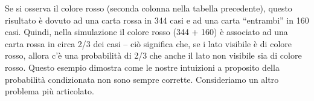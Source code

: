 \documentclass[
  11pt,
]{krantz}
\makeatletter
\newenvironment{Shaded}{\begin{snugshade}}{\end{snugshade}}
\newcommand{\AttributeTok}[1]{\textcolor[rgb]{0.61,0.61,0.61}{#1}}
\newcommand{\CommentTok}[1]{\textcolor[rgb]{0.37,0.37,0.37}{\textit{#1}}}
\newcommand{\ConstantTok}[1]{\textcolor[rgb]{0,0,0}{#1}}
\newcommand{\DecValTok}[1]{\textcolor[rgb]{0.06,0.06,0.06}{#1}}
\newcommand{\FunctionTok}[1]{\textcolor[rgb]{0,0,0}{#1}}
\newcommand{\NormalTok}[1]{#1}
\newcommand{\OtherTok}[1]{\textcolor[rgb]{0.37,0.37,0.37}{#1}}
\newcommand{\SpecialCharTok}[1]{\textcolor[rgb]{0,0,0}{#1}}
\newcommand{\StringTok}[1]{\textcolor[rgb]{0.5,0.5,0.5}{#1}}
\newenvironment{kframe}{%
\medskip{}
\setlength{\fboxsep}{.8em}
 \def\at@end@of@kframe{}%
 \ifinner\ifhmode%
  \def\at@end@of@kframe{\end{minipage}}%
  \begin{minipage}{\columnwidth}%
 \fi\fi%
 \def\FrameCommand##1{\hskip\@totalleftmargin \hskip-\fboxsep
 \colorbox{shadecolor}{##1}\hskip-\fboxsep
     \hskip-\linewidth \hskip-\@totalleftmargin \hskip\columnwidth}%
 \MakeFramed {\advance\hsize-\width
   \@totalleftmargin\z@ \linewidth\hsize
   \@setminipage}}%
 {\par\unskip\endMakeFramed%
 \at@end@of@kframe}
\renewenvironment{Shaded}{\begin{kframe}}{\end{kframe}}
\theoremstyle{definition}
\theoremstyle{definition}
\theoremstyle{definition}
\theoremstyle{definition}
\theoremstyle{remark}
\makeatother
\begin{document}
\begin{Shaded}
\end{Shaded}

Se si osserva il colore rosso (seconda colonna nella tabella precedente), questo risultato è dovuto ad una carta rossa in 344 casi e ad una carta ``entrambi'' in 160 casi. Quindi, nella simulazione il colore rosso (344 + 160) è associato ad una carta rossa in circa 2/3 dei casi -- ciò significa che, se i lato visibile è di colore rosso, allora c'è una probabilità di 2/3 che anche il lato non visibile sia di colore rosso. Questo esempio dimostra come le nostre intuizioni a proposito della probabilità condizionata non sono sempre corrette. Consideriamo un altro problema più articolato.
\end{document}
